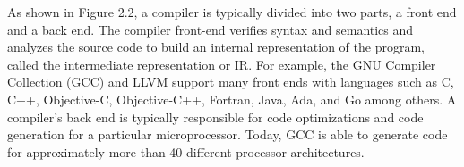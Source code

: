 As shown in Figure 2.2, a compiler is typically divided into two parts, a front end and a back end. The compiler front-end verifies syntax and semantics and analyzes the source code to build an internal representation of the program, called the intermediate representation or IR. For example, the GNU Compiler Collection (GCC) and LLVM support many front ends with languages such as C, C++, Objective-C, Objective-C++, Fortran, Java, Ada, and Go among others. 
A compiler’s back end is typically responsible for code optimizations and code generation for a particular microprocessor. Today, GCC is able to generate code for approximately more than 40 different processor architectures.







